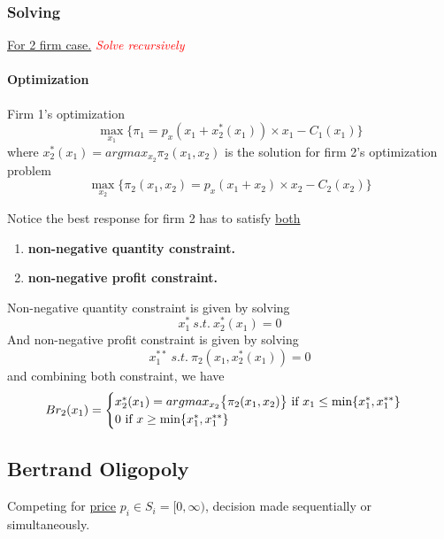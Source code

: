 \documentclass[]{article}
\begin{document}
            \subsubsection{Solving}
                \ul{For 2 firm case.} \textcolor{red}{\emph{Solve recursively}}
                \paragraph{Optimization} Firm 1's optimization
                    \[
                        \max_{x_1} \big \{ \pi_1 = p_x (x_1 + x_2^*(x_1)) \times x_1 - C_1(x_1) \big \}
                    \]
                    where $x_2^*(x_1) = argmax_{x_2}\pi_2(x_1, x_2)$ is the solution for firm 2's optimization problem
                    \[
                        \max_{x_2} \big \{ \pi_2 (x_1, x_2) = p_x(x_1 + x_2) \times x_2 - C_2(x_2) \big \}
                    \]
                
                \begin{remark}
                    Notice the best response for firm 2 has to satisfy \ul{both} 
                    \begin{enumerate}
                        \item \textbf{non-negative quantity constraint.}
                        \item \textbf{non-negative profit constraint.}
                    \end{enumerate}
                    Non-negative quantity constraint is given by solving 
                    \[
                        x_{1}^*\ s.t.\ x_2^*(x_1) = 0
                    \]
                    And non-negative profit constraint is given by solving
                    \[
                        x_{1}^{**}\ s.t.\ \pi_2(x_1, x_2^*(x_1)) = 0 
                    \]
                    and combining both constraint, we have 
                    \[
                        Br_2(x_1) = 
                        \begin{cases}
                            x_2^*(x_1) = argmax_{x_2} \big \{ \pi_2(x_1,x_2) \big \} \text{{ if }} x_1 \leq \min\{x_1^*, x_1^{**}\} \\
                            0 \text{{ if }} x \geq \min\{x_1^*, x_1^{**}\} \\
                        \end{cases}
                    \]
                \end{remark}
            
        \subsection{Bertrand Oligopoly}
            \par Competing for \ul{price} $p_i \in S_i = [0, \infty)$, decision made sequentially or simultaneously.
\end{document}
